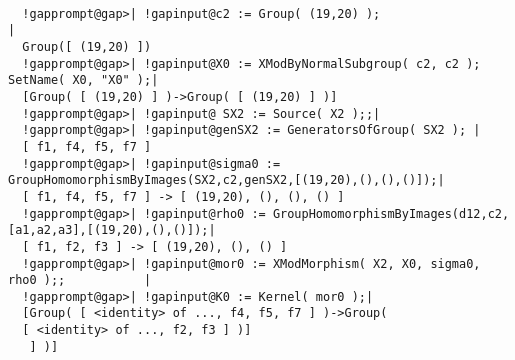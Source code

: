 \documentclass[a4paper,11pt]{report}
\begin{document}
{{ 

 
\begin{Verbatim}[commandchars=!@|,fontsize=\small,frame=single,label=Example]
  
  !gapprompt@gap>| !gapinput@c2 := Group( (19,20) );                                    |
  Group([ (19,20) ])
  !gapprompt@gap>| !gapinput@X0 := XModByNormalSubgroup( c2, c2 );  SetName( X0, "X0" );|
  [Group( [ (19,20) ] )->Group( [ (19,20) ] )]
  !gapprompt@gap>| !gapinput@ SX2 := Source( X2 );;|
  !gapprompt@gap>| !gapinput@genSX2 := GeneratorsOfGroup( SX2 ); |
  [ f1, f4, f5, f7 ]
  !gapprompt@gap>| !gapinput@sigma0 := GroupHomomorphismByImages(SX2,c2,genSX2,[(19,20),(),(),()]);|
  [ f1, f4, f5, f7 ] -> [ (19,20), (), (), () ]
  !gapprompt@gap>| !gapinput@rho0 := GroupHomomorphismByImages(d12,c2,[a1,a2,a3],[(19,20),(),()]);|
  [ f1, f2, f3 ] -> [ (19,20), (), () ]
  !gapprompt@gap>| !gapinput@mor0 := XModMorphism( X2, X0, sigma0, rho0 );;           |
  !gapprompt@gap>| !gapinput@K0 := Kernel( mor0 );|
  [Group( [ <identity> of ..., f4, f5, f7 ] )->Group( 
  [ <identity> of ..., f2, f3 ] )]
   ] )]
\end{Verbatim}
 }

 }

           
\end{document}
